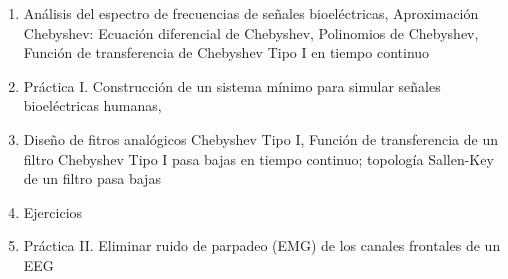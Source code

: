 \begin{enumerate}
  \item Análisis del espectro de frecuencias de señales bioeléctricas, Aproximación Chebyshev: Ecuación diferencial de Chebyshev, Polinomios de Chebyshev, Función de transferencia de Chebyshev Tipo I en tiempo continuo
  \item Práctica I. Construcción de un sistema mínimo para simular señales bioeléctricas humanas, 
  \item Diseño de fitros analógicos Chebyshev Tipo I, Función de transferencia de un filtro Chebyshev Tipo I pasa bajas en tiempo continuo; topología Sallen-Key de un filtro pasa bajas
  \item Ejercicios
  \item Práctica II. Eliminar ruido de parpadeo (EMG) de los canales frontales de un EEG 
\end{enumerate}